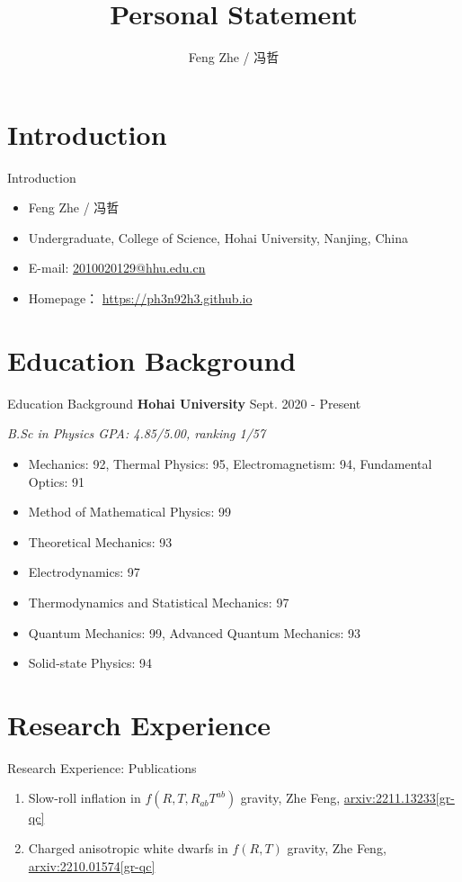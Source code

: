 \documentclass[9pt,aspectratio=169,hyperref=colorlinks]{beamer}
\title{Personal Statement}
\institute{College of Science, Hohai University}
\author{Feng Zhe / 冯哲}
\begin{document}
\frame{\titlepage}

\section{Introduction}
\begin{frame}{Introduction}
    \begin{itemize}
        \item Feng Zhe / 冯哲
        \item Undergraduate, College of Science, Hohai University, Nanjing, China
        \item E-mail: \href{mailto:2010020129@hhu.edu.cn}{2010020129@hhu.edu.cn}
        \item Homepage： \href{https://ph3n92h3.github.io}{https://ph3n92h3.github.io}
    \end{itemize}
\end{frame}

\section{Education Background}
\begin{frame}{Education Background}
    \textbf{Hohai University} \hfill Sept. 2020 - Present

    \textit{B.Sc in Physics \hfill GPA: 4.85/5.00, ranking 1/57}

    \begin{itemize}
        \item Mechanics: 92, Thermal Physics: 95, Electromagnetism: 94, Fundamental Optics: 91
        \item Method of Mathematical Physics: 99
        \item Theoretical Mechanics: 93
        \item Electrodynamics: 97
        \item Thermodynamics and Statistical Mechanics: 97
        \item Quantum Mechanics: 99, Advanced Quantum Mechanics: 93
        \item Solid-state Physics: 94
    \end{itemize}
\end{frame}

\section{Research Experience}
\begin{frame}{Research Experience: Publications}
    \begin{enumerate}
        \item Slow-roll inflation in $f\left(R, T, R_{ab}T^{ab}\right)$ gravity, Zhe Feng, \href{https://arxiv.org/abs/2211.13233}{arxiv:2211.13233[gr-qc]}
        \item Charged anisotropic white dwarfs in $f\left({R}, {T}\right)$ gravity, Zhe Feng, \href{https://arxiv.org/abs/2210.01574}{arxiv:2210.01574[gr-qc]}
    \end{enumerate}
\end{frame}
\end{document}
